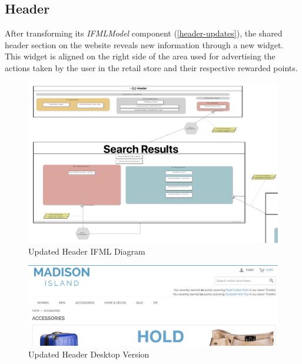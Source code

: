 \newpage
\subsection{Header}

After transforming its \textit{IFMLModel} component (\ref{header-updates}), the shared header section on the website reveals new information through a new widget. This widget is aligned on the right side of the area used for advertising the actions taken by the user in the retail store and their respective rewarded points.

\vspace{0.5cm}
\begin{figure}[H]
  \centering
    \includegraphics[width=14cm]{images/diagrams/after/ifml-header.png}
  \caption{Updated Header IFML Diagram}
  \label{fig:ifml-after-header}
\end{figure}

\begin{figure}[H]
  \centering
    \includegraphics[width=14cm]{images/diagrams/after/desktop-header.png}
  \caption{Updated Header Desktop Version}
  \label{fig:desktop-after-header}
\end{figure}
\vspace{0.5cm}

\newpage
